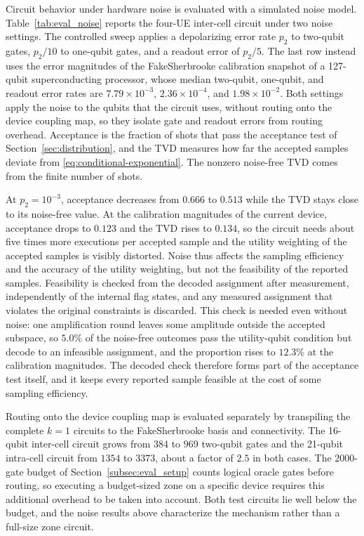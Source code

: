 Circuit behavior under hardware noise is evaluated with a simulated noise model. Table~\ref{tab:eval_noise} reports the four-UE inter-cell circuit under two noise settings. The controlled sweep applies a depolarizing error rate $p_2$ to two-qubit gates, $p_2/10$ to one-qubit gates, and a readout error of $p_2/5$. The last row instead uses the error magnitudes of the FakeSherbrooke calibration snapshot of a 127-qubit superconducting processor, whose median two-qubit, one-qubit, and readout error rates are $7.79\times10^{-3}$, $2.36\times10^{-4}$, and $1.98\times10^{-2}$. Both settings apply the noise to the qubits that the circuit uses, without routing onto the device coupling map, so they isolate gate and readout errors from routing overhead. Acceptance is the fraction of shots that pass the acceptance test of Section~\ref{sec:distribution}, and the TVD measures how far the accepted samples deviate from \eqref{eq:conditional-exponential}. The nonzero noise-free TVD comes from the finite number of shots.

At $p_2=10^{-3}$, acceptance decreases from $0.666$ to $0.513$ while the TVD stays close to its noise-free value. At the calibration magnitudes of the current device, acceptance drops to $0.123$ and the TVD rises to $0.134$, so the circuit needs about five times more executions per accepted sample and the utility weighting of the accepted samples is visibly distorted. Noise thus affects the sampling efficiency and the accuracy of the utility weighting, but not the feasibility of the reported samples. Feasibility is checked from the decoded assignment after measurement, independently of the internal flag states, and any measured assignment that violates the original constraints is discarded. This check is needed even without noise: one amplification round leaves some amplitude outside the accepted subspace, so $5.0\%$ of the noise-free outcomes pass the utility-qubit condition but decode to an infeasible assignment, and the proportion rises to $12.3\%$ at the calibration magnitudes. The decoded check therefore forms part of the acceptance test itself, and it keeps every reported sample feasible at the cost of some sampling efficiency.

Routing onto the device coupling map is evaluated separately by transpiling the complete $k=1$ circuits to the FakeSherbrooke basis and connectivity. The 16-qubit inter-cell circuit grows from $384$ to $969$ two-qubit gates and the 21-qubit intra-cell circuit from $1354$ to $3373$, about a factor of $2.5$ in both cases. The 2000-gate budget of Section~\ref{subsec:eval_setup} counts logical oracle gates before routing, so executing a budget-sized zone on a specific device requires this additional overhead to be taken into account. Both test circuits lie well below the budget, and the noise results above characterize the mechanism rather than a full-size zone circuit.

